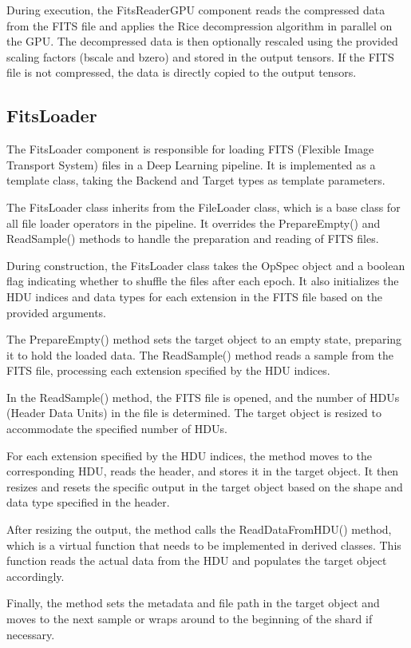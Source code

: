 \documentclass[licencjacka,en]{pracamgr}
\begin{document}
During execution, the FitsReaderGPU component reads the compressed data from the FITS file and applies the Rice decompression algorithm in parallel on the GPU. The decompressed data is then optionally rescaled using the provided scaling factors (bscale and bzero) and stored in the output tensors. If the FITS file is not compressed, the data is directly copied to the output tensors.

\subsection{FitsLoader}

The FitsLoader component is responsible for loading FITS (Flexible Image Transport System) files in a Deep Learning pipeline. It is implemented as a template class, taking the Backend and Target types as template parameters.

The FitsLoader class inherits from the FileLoader class, which is a base class for all file loader operators in the pipeline. It overrides the PrepareEmpty() and ReadSample() methods to handle the preparation and reading of FITS files.

During construction, the FitsLoader class takes the OpSpec object and a boolean flag indicating whether to shuffle the files after each epoch. It also initializes the HDU indices and data types for each extension in the FITS file based on the provided arguments.

The PrepareEmpty() method sets the target object to an empty state, preparing it to hold the loaded data. The ReadSample() method reads a sample from the FITS file, processing each extension specified by the HDU indices.

In the ReadSample() method, the FITS file is opened, and the number of HDUs (Header Data Units) in the file is determined. The target object is resized to accommodate the specified number of HDUs.

For each extension specified by the HDU indices, the method moves to the corresponding HDU, reads the header, and stores it in the target object. It then resizes and resets the specific output in the target object based on the shape and data type specified in the header.

After resizing the output, the method calls the ReadDataFromHDU() method, which is a virtual function that needs to be implemented in derived classes. This function reads the actual data from the HDU and populates the target object accordingly.

Finally, the method sets the metadata and file path in the target object and moves to the next sample or wraps around to the beginning of the shard if necessary.
\end{document}
